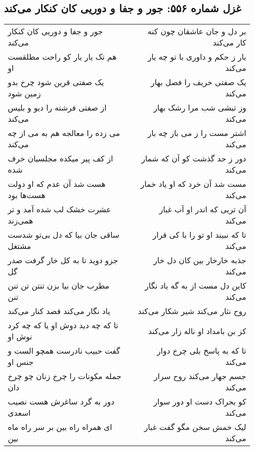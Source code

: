 \begin{center}
\section*{غزل شماره ۵۵۶: جور و جفا و دوریی کان کنکار می‌کند}
\label{sec:0556}
\begin{longtable}{l p{0.5cm} r}
جور و جفا و دوریی کان کنکار می‌کند
&&
بر دل و جان عاشقان چون کنه کار می‌کند
\\
هم تک یار یار کو راحت مطلقست او
&&
یار ز حکم و داوری با تو چه یار می‌کند
\\
یک صفتی قرین شود چرخ بدو زمین شود
&&
یک صفتی خریف را فصل بهار می‌کند
\\
از صفتی فرشته را دیو و بلیس می‌کند
&&
وز تبشی شب مرا رشک بهار می‌کند
\\
می زده را معالجه هم به می از چه می‌کند
&&
اشتر مست را ز می باز چه بار می‌کند
\\
از کف پیر میکده مجلسیان خرف شده
&&
دور ز حد گذشت کو آن که شمار می‌کند
\\
هست شد آن عدم که او دولت هست‌ها بود
&&
مست شد آن خرد که او یاد خمار می‌کند
\\
عشرت خشک لب شده آمد و تر همی‌زند
&&
آن تریی که اندر او آب غبار می‌کند
\\
ساقی جان بیا که دل بی‌تو شدست مشتغل
&&
تا که نبیند او تو را با کی قرار می‌کند
\\
جزو دوید تا به کل خار گرفت صدر گل
&&
جذبه خارخار بین کان دل خار می‌کند
\\
مطرب جان بیا بزن تنتن تن تنن تنن
&&
کاین دل مست از به گه یاد نگار می‌کند
\\
یاد نگار می‌کند قصد کنار می‌کند
&&
روح نثار می‌کند شیر شکار می‌کند
\\
تا که چه دید دوش او یا که چه کرد نوش او
&&
کز بن بامداد او ناله زار می‌کند
\\
گفت حبیب نادرست همچو الست و جنس او
&&
تا که به پاسخ بلی چرخ دوار می‌کند
\\
جمله مکونات را چرخ زنان چو چرخ دان
&&
جسم جهار می‌کند روح سرار می‌کند
\\
دور به گرد ساغرش هست نصیب اسعدی
&&
کو بحراک دست او دور سوار می‌کند
\\
ای همراه راه بین بر سر راه ماه بین
&&
لیک خمش سخن مگو گفت غبار می‌کند
\\
\end{longtable}
\end{center}
